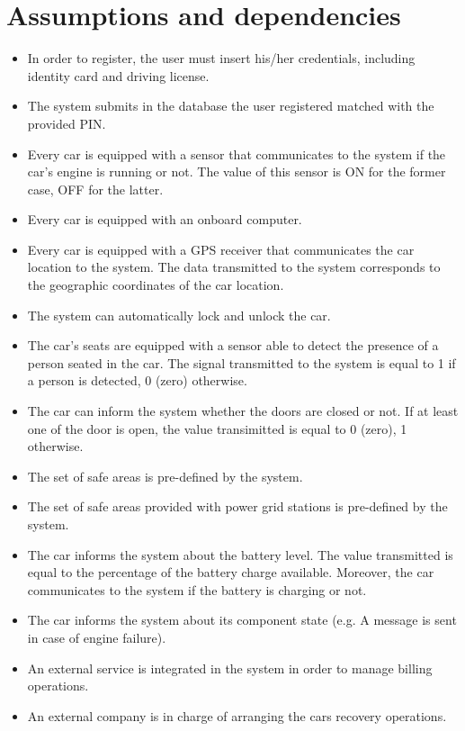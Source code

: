 \section{Assumptions and dependencies}

\begin{itemize}
	\item In order to register, the user must insert his/her credentials, including identity card and driving license.
	\item The system submits in the database the user registered matched with the provided PIN.
	\item Every car is equipped with a sensor that communicates to the system if the car's engine is running or not. The value of this sensor is ON for the former case, OFF for the latter.
	\item Every car is equipped with an onboard computer.
	\item Every car is equipped with a GPS receiver that communicates the car location to the system. The data transmitted to the system corresponds to the geographic coordinates of the car location.
	\item The system can automatically lock and unlock the car.
	\item The car's seats are equipped with a sensor able to detect the presence of a person seated in the car. The signal transmitted to the system is equal to 1 if a person is detected, 0 (zero) otherwise.
	\item The car can inform the system whether the doors are closed or not. If at least one of the door is open, the value transimitted is equal to 0 (zero), 1 otherwise.
	\item The set of safe areas is pre-defined by the system.
	\item The set of safe areas provided with power grid stations is pre-defined by the system.
	\item The car informs the system about the battery level. The value transmitted is equal to the percentage of the battery charge available. Moreover, the car communicates to the system if the battery is charging or not.
	\item The car informs the system about its component state (e.g. A message is sent in case of engine failure).
	\item An external service is integrated in the system in order to manage billing operations.
	\item An external company is in charge of arranging the cars recovery operations.
\end{itemize}